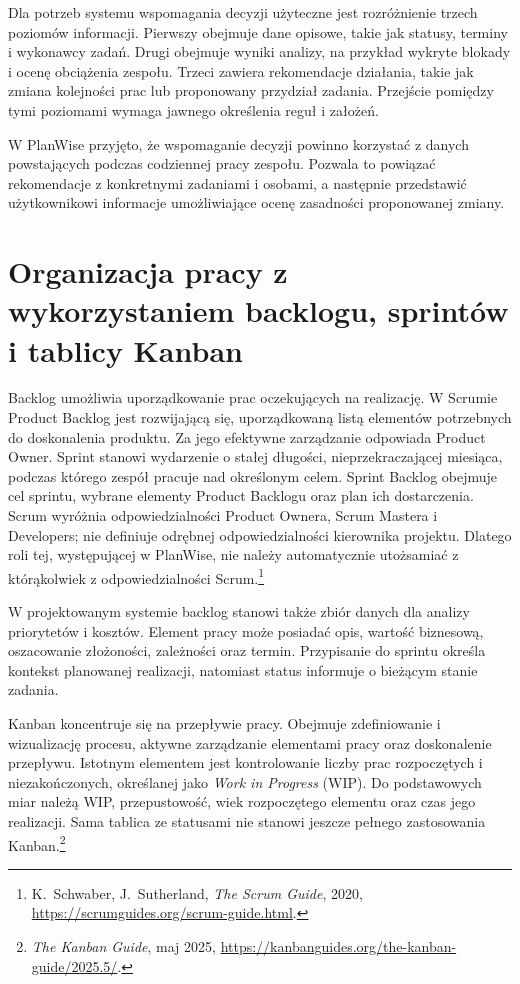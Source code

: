 Dla potrzeb systemu wspomagania decyzji użyteczne jest rozróżnienie trzech poziomów informacji. Pierwszy obejmuje dane opisowe, takie jak statusy, terminy i wykonawcy zadań. Drugi obejmuje wyniki analizy, na przykład wykryte blokady i ocenę obciążenia zespołu. Trzeci zawiera rekomendacje działania, takie jak zmiana kolejności prac lub proponowany przydział zadania. Przejście pomiędzy tymi poziomami wymaga jawnego określenia reguł i założeń.

W PlanWise przyjęto, że wspomaganie decyzji powinno korzystać z danych powstających podczas codziennej pracy zespołu. Pozwala to powiązać rekomendacje z konkretnymi zadaniami i osobami, a następnie przedstawić użytkownikowi informacje umożliwiające ocenę zasadności proponowanej zmiany.


\section{Organizacja pracy z wykorzystaniem backlogu, sprintów i tablicy Kanban}
\label{sec:backlog-sprinty-kanban}

Backlog umożliwia uporządkowanie prac oczekujących na realizację. W Scrumie Product Backlog jest rozwijającą się, uporządkowaną listą elementów potrzebnych do doskonalenia produktu. Za jego efektywne zarządzanie odpowiada Product Owner. Sprint stanowi wydarzenie o stałej długości, nieprzekraczającej miesiąca, podczas którego zespół pracuje nad określonym celem. Sprint Backlog obejmuje cel sprintu, wybrane elementy Product Backlogu oraz plan ich dostarczenia. Scrum wyróżnia odpowiedzialności Product Ownera, Scrum Mastera i Developers; nie definiuje odrębnej odpowiedzialności kierownika projektu. Dlatego roli tej, występującej w PlanWise, nie należy automatycznie utożsamiać z którąkolwiek z odpowiedzialności Scrum.\footnote{K.~Schwaber, J.~Sutherland, \textit{The Scrum Guide}, 2020, \url{https://scrumguides.org/scrum-guide.html}.}

W projektowanym systemie backlog stanowi także zbiór danych dla analizy priorytetów i kosztów. Element pracy może posiadać opis, wartość biznesową, oszacowanie złożoności, zależności oraz termin. Przypisanie do sprintu określa kontekst planowanej realizacji, natomiast status informuje o bieżącym stanie zadania.

Kanban koncentruje się na przepływie pracy. Obejmuje zdefiniowanie i wizualizację procesu, aktywne zarządzanie elementami pracy oraz doskonalenie przepływu. Istotnym elementem jest kontrolowanie liczby prac rozpoczętych i niezakończonych, określanej jako \textit{Work in Progress} (WIP). Do podstawowych miar należą WIP, przepustowość, wiek rozpoczętego elementu oraz czas jego realizacji. Sama tablica ze statusami nie stanowi jeszcze pełnego zastosowania Kanban.\footnote{\textit{The Kanban Guide}, maj 2025, \url{https://kanbanguides.org/the-kanban-guide/2025.5/}.}

